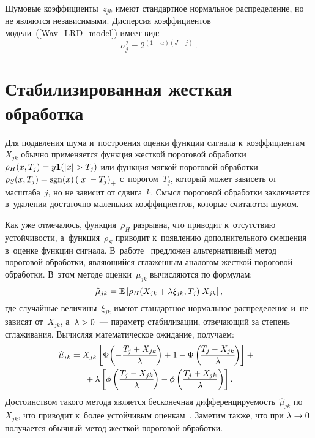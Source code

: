 \begin{multicols}{2}
Шумовые коэффициенты~$z_{jk}$ имеют стандартное нормальное распределение, 
но не являются независимыми. Дис\-пер\-сия коэффициентов модели~(\ref{Wav_LRD_model}) 
имеет вид:
$$
\sigma_j^2= 2^{(1-\alpha)(J-j)}\,.
$$


\section{Стабилизированная жесткая обработка}

Для подавления шума и~построения оценки функции сигнала к~коэффициентам~$X_{jk}$ 
обычно применяется функция жесткой пороговой обработки $\rho_{H}(x,T_j)
\hm=y\I(\abs{x}>T_j)$ или функция мяг\-кой пороговой обработки $\rho_{S}(x,T_j)
\hm=\mathrm{sgn}(x)\left(\abs{x}-T_j\right)_{+}$ с~порогом~$T_j$, 
который может зависеть от мас\-шта\-ба~$j$, но не зависит от сдвига~$k$. 
Смысл пороговой обработки заключается в~удалении до\-ста\-точ\-но маленьких коэффициентов, 
которые считаются шумом.

Как уже отмечалось, функция~$\rho_{H}$ разрывна, что приводит к~отсутствию 
устой\-чи\-вости, а~функция~$\rho_{S}$ приводит к~по\-яв\-ле\-нию дополнительного 
смещения в~оценке функции сигнала. В~работе~\cite{HL10} предложен альтернативный 
метод пороговой обработки, являющийся сгла\-жен\-ным аналогом жест\-кой пороговой 
обработки. В~этом методе оценки~$\mu_{jk}$ вы\-чис\-ля\-ют\-ся по формулам:
\begin{equation*}
\widehat{\mu}_{jk}=
\mathbb{E} \left[\rho_{H}(X_{jk}+\lambda\xi_{jk},T_j)|X_{jk}\right],
\end{equation*}
где случайные величины~$\xi_{jk}$ имеют стандартное нормальное распределение и~не 
зависят от~$X_{jk}$, а~$\lambda\hm>0$~--- 
параметр стабилизации, отвечающий за степень сглаживания. 
Вы\-чис\-ляя математическое ожидание, получаем:
\begin{multline*}
\hspace*{-1.5mm}\widehat{\mu}_{jk}=X_{jk}\left[\Phi\!\left(-\displaystyle\frac{\displaystyle T_j+X_{jk}\mathstrut}{\displaystyle \lambda\mathstrut}\!\right)+1-
\Phi\left(\!\displaystyle\frac{\displaystyle T_j-X_{jk}\mathstrut}{\displaystyle \lambda\mathstrut}\!\right)\right]+{}\hspace*{0.43806pt}\hspace*{-0.87613pt}\\
{}+\lambda\left[
\phi\left(\displaystyle\frac{\displaystyle T_j-X_{jk}\mathstrut}{\displaystyle \lambda\mathstrut}\!\right)-
\phi\left(\displaystyle\frac{\displaystyle T_j+X_{jk}\mathstrut}{\displaystyle \lambda\mathstrut}\right)\right].
\end{multline*}
Достоинством такого метода является бесконечная диф\-фе\-рен\-ци\-ру\-емость~$\widehat{\mu}_{jk}$ 
по~$X_{jk}$, что приводит к~более устойчивым оценкам~\cite{HL10}. Заметим также, 
что при $\lambda\hm\to0$ получается обычный метод жест\-кой пороговой обработки.


\end{multicols}
